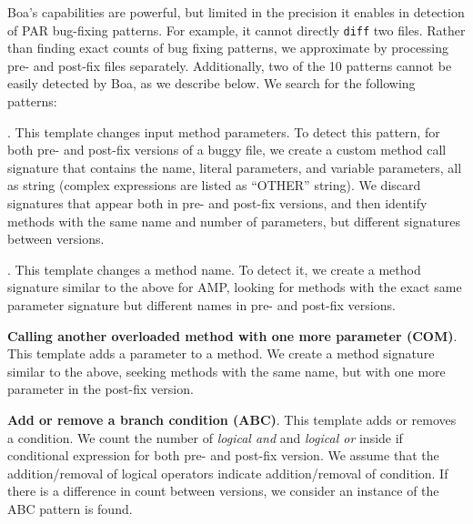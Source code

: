 \documentclass{sig-alternate-05-2015}
\begin{document}
Boa's capabilities are powerful, but limited in the precision it enables in
detection of PAR bug-fixing patterns. For example, it cannot directly \texttt{diff}
two files. Rather than finding exact counts of
bug fixing patterns, we approximate by processing pre- and
post-fix files separately.  Additionally, 
two of the 10 patterns cannot be easily detected by
Boa, as we describe below. 
%
We search for the following patterns:

.  This template changes 
input method parameters. %
To detect this pattern, for both pre- and post-fix versions
of a buggy file, we create a custom method call signature that
contains the name, literal parameters, and variable parameters, all as string (complex
expressions are listed as ``OTHER'' string).
We discard signatures that appear both in pre- and post-fix
versions, and then identify methods with the same name and 
number of parameters, but different signatures between versions. 

.  This
template changes a method name. %
To detect it, we create a method signature similar
to the above for AMP, looking for methods
with the exact same parameter signature but different names in pre- and
post-fix versions. %

\noindent
{\bf Calling another overloaded method with one more parameter (COM)}. This
template adds a parameter to a method. %
We create a method signature similar to the above, seeking methods with
  the same name, but with one more parameter in the post-fix version. 

\noindent
 {\bf Add or remove a branch condition (ABC)}. This template adds or removes a condition.
We count the number of { \em logical and} and {\em
    logical or} inside if conditional expression for both pre- and post-fix
  version. We assume that the addition/removal of logical operators indicate
  addition/removal of condition. If there is a difference in count between versions,
  we consider an instance of the ABC pattern is found. 
\end{document}
